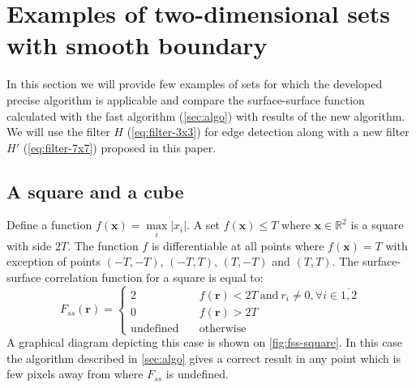 \documentclass[reprint,amsmath,amssymb,aps,pre,showkeys,showpacs]{revtex4-1}
\begin{document}
\section{Examples of two-dimensional sets with smooth boundary}
\label{seq:examples}
In this section we will provide few examples of sets for which the developed
precise algorithm is applicable and compare the surface-surface function
calculated with the fast algorithm (\cref{sec:algo}) with results of the new
algorithm. We will use the filter $H$ (\ref{eq:filter-3x3}) for edge
detection along with a new filter $H'$ (\ref{eq:filter-7x7}) proposed in this
paper.

\subsection{A square and a cube}
Define a function $f(\bm{x}) = \max\limits_i |x_i|$. A set $f(\bm{x}) \le T$
where $\bm{x} \in \mathbb{R}^2$ is a square with side $2T$. The function $f$ is
differentiable at all points where $f(\bm{x}) = T$ with exception of points
$(-T, -T)$, $(-T, T)$, $(T, -T)$ and $(T, T)$. The surface-surface correlation
function for a square is equal to:
\begin{equation*}
  F_{ss}(\bm{r}) = \left\{
  \begin{array}{ll}
    2 & \quad f(\bm{r}) < 2T \ \text{and}\ r_i \ne 0, \forall i \in \overline{1,2} \\
    0 & \quad f(\bm{r}) > 2T \\
    \text{undefined} & \quad \text{otherwise}
  \end{array}
  \right.
\end{equation*}
A graphical diagram depicting this case is shown on \cref{fig:fss-square}. In
this case the algorithm described in \cref{sec:algo} gives a correct result in
any point which is few pixels away from where $F_{ss}$ is undefined.
\end{document}
